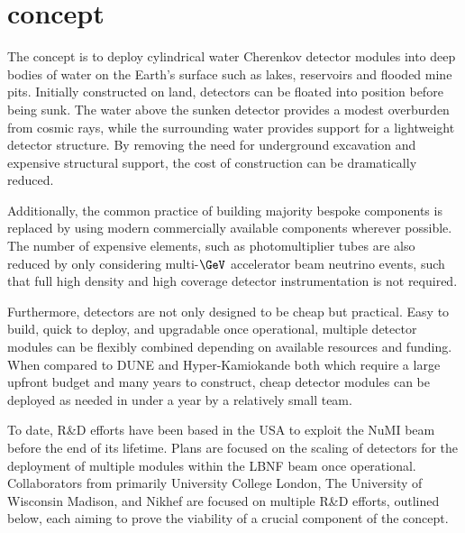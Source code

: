 \section{\chips concept} %
\label{sec:chips_concept} %

The \chips concept is to deploy cylindrical water Cherenkov detector modules into deep bodies of
water on the Earth's surface such as lakes, reservoirs and flooded mine pits. Initially
constructed on land, \chips detectors can be floated into position before being sunk. The water
above the sunken detector provides a modest overburden from cosmic rays, while the surrounding
water provides support for a lightweight detector structure. By removing the need for underground
excavation and expensive structural support, the cost of construction can be dramatically reduced.

Additionally, the common practice of building majority bespoke components is replaced by using
modern commercially available components wherever possible. The number of expensive elements, such
as photomultiplier tubes are also reduced by only considering multi-$\GeV$ accelerator beam
neutrino events, such that full high density and high coverage detector instrumentation is not
required.

Furthermore, \chips detectors are not only designed to be cheap but practical. Easy to build,
quick to deploy, and upgradable once operational, multiple detector modules can be flexibly
combined depending on available resources and funding. When compared to DUNE and Hyper-Kamiokande
both which require a large upfront budget and many years to construct, cheap \chips detector
modules can be deployed as needed in under a year by a relatively small team.

To date, \chips R\&D efforts have been based in the USA to exploit the NuMI beam before the end of
its lifetime. Plans are focused on the scaling of \chips detectors for the deployment of multiple
modules within the LBNF beam once operational. Collaborators from primarily University College
London, The University of Wisconsin Madison, and Nikhef are focused on multiple R\&D efforts,
outlined below, each aiming to prove the viability of a crucial component of the \chips concept.

